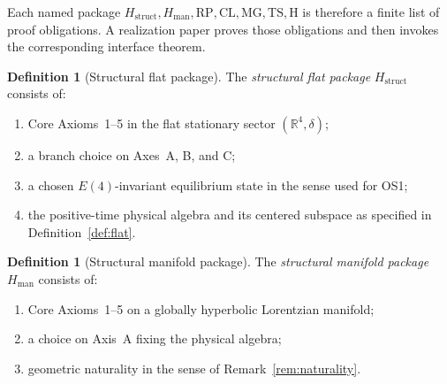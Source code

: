 \documentclass[12pt,a4paper]{article}
\theoremstyle{plain}
\theoremstyle{definition}
\newtheorem{definition}[theorem]{Definition}
\theoremstyle{remark}
\newcommand{\real}{\mathbb{R}}
\begin{document}
Each named package
\(H_{\mathrm{struct}}, H_{\mathrm{man}}, \mathrm{RP}, \mathrm{CL},
\mathrm{MG}, \mathrm{TS}, \mathrm{H}\) is therefore a finite list of
proof obligations. A realization paper proves those obligations and
then invokes the corresponding interface theorem.

\begin{definition}[Structural flat package]\label{def:hstruct}
  The \emph{structural flat package} $H_{\mathrm{struct}}$ consists of:
  \begin{enumerate}[nosep,label=(S\arabic*)]
  \item Core Axioms~1--5 in the flat stationary sector
    $(\real^4,\delta)$;
  \item a branch choice on Axes~A, B, and C;
  \item a chosen $E(4)$-invariant equilibrium state in the sense used
    for OS1;
  \item the positive-time physical algebra and its centered subspace
    as specified in Definition~\ref{def:flat}.
  \end{enumerate}
\end{definition}

\begin{definition}[Structural manifold package]\label{def:hman}
  The \emph{structural manifold package} $H_{\mathrm{man}}$ consists of:
  \begin{enumerate}[nosep,label=(M\arabic*)]
  \item Core Axioms~1--5 on a globally hyperbolic Lorentzian manifold;
  \item a choice on Axis~A fixing the physical algebra;
  \item geometric naturality in the sense of
    Remark~\ref{rem:naturality}.
  \end{enumerate}
\end{definition}
\end{document}
